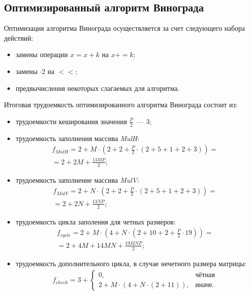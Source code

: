 \subsection*{Оптимизированный алгоритм Винограда}
Оптимизация алгоритма Винограда осуществляется за счет следующего набора действий:
\begin{itemize}
	\item замены операции $x = x + k$ на $x += k$;
	\item замены $\cdot 2$ на $<<$;
	\item предвычисления некоторых слагаемых для алгоритма.
\end{itemize}
Итоговая трудоемкость оптимизированного алгоритма Винограда состоит из:
\begin{itemize}
	\item трудоемкости кеширования значения $\frac{P}{2}$~--- 3;
	\item трудоемкость заполнения массива \textit{MulH}:
	\begin{equation}
		\begin{gathered}
			f_{MulH} = 2 + M \cdot (2 + 2 + \frac{P}{2} \cdot (2 + 5 + 1 + 2 + 3)) = \\
			= 2 + 2M + \frac{13MP}{2};
		\end{gathered}
	\end{equation}
	\item трудоемкость заполнение массива \textit{MulV}:
	\begin{equation}
		\begin{gathered}
			f_{MulV} = 2 + N \cdot (2 + 2 + \frac{P}{2} \cdot (2 + 5 + 1 + 2 + 3)) = \\
			= 2 + 2N + \frac{13NP}{2};
		\end{gathered}
	\end{equation}
	\item трудоемкость цикла заполения для четных размеров:
	\begin{equation}
		\begin{gathered}
			f_{cycle} = 2 + M \cdot (4 + N \cdot (2 + 10 + 2 + \frac{P}{2} \cdot 19)) = \\
			= 2 + 4M + 14MN + \frac{19MNP}{2};
		\end{gathered}
	\end{equation}
	\item трудоемкость дополнительного цикла, в случае нечетного размера матрицы:
	\begin{equation}
		\begin{gathered}
			f_{check} = 3 + 
			\begin{cases}
				0, & \text{чётная} \\
				2 + M \cdot (4 + N \cdot (2 + 11)), & \text{иначе}.
			\end{cases}
		\end{gathered}  
	\end{equation}
\end{itemize}
